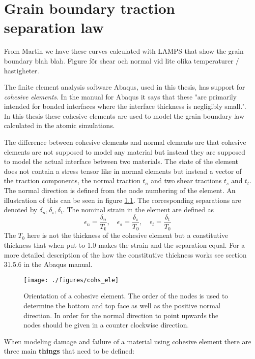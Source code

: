 \documentclass[generate_interface_elements.tex]{subfiles}
\begin{document}
\chapter{Grain boundary traction separation law}

From Martin we have these curves calculated with LAMPS that show the grain boundary blah blah. Figure för shear och normal vid lite olika temperaturer / hastigheter.



The finite element analysis software Abaqus, used in this thesis, has support for \textit{cohesive elements}. In the manual for Abaqus it says that these "are primarily intended for bonded interfaces where the interface thickness is negligibly small.". In this thesis these cohesive elements are used to model the grain boundary law calculated in the atomic simulations.

The difference between cohesive elements and normal elements are that cohesive elements are not supposed to model any material but instead they are supposed to model the actual interface between two materials. The state of the element does not contain a stress tensor like in normal elements but instead a vector of the traction components, the normal traction $t_n$ and two shear tractions $t_s$ and $t_t$. The normal direction is defined from the node numbering of the element. An illustration of this can be seen in figure \ref{fig:cohs_ori}. The corresponding separations are denoted by $\delta_n, \delta_s, \delta_t$. The nominal strain in the element are defined as
%
\[ \epsilon_n = \frac{\delta_n}{T_0}, \quad \epsilon_s = \frac{\delta_s}{T_0}, \quad \epsilon_t = \frac{\delta_t}{T_0}  \]
%
The $T_0$ here is not the thickness of the cohesive element but a constitutive thickness that when put to 1.0 makes the strain and the separation equal. For a more detailed description of the how the constitutive thickness works see section 31.5.6 in the Abaqus manual.




\begin{figure}
\centering
 \texttt{[image: ./figures/cohs\_ele]}
\caption{Orientation of a cohesive element. The order of the nodes is used to determine the bottom and top face as well as the positive normal direction. In order for the normal direction to point upwards the nodes should be given in a counter clockwise direction.}
\label{fig:cohs_ori}
\end{figure}


When modeling damage and failure of a material using cohesive element there are three main \textbf{things} that need to be defined:
\end{document}
